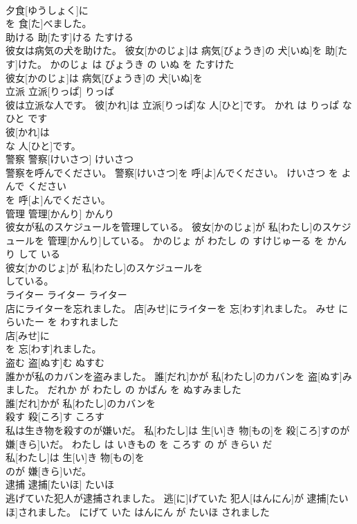 \documentclass[8pt]{extreport}
\begin{document}
\begin{CJK}{UTF8}{min}
\\	夕食[ゆうしょく]に
\\	を 食[た]べました。		
\\	助ける	助[たす]ける	たすける	
\\	彼女は病気の犬を助けた。	彼女[かのじょ]は 病気[びょうき]の 犬[いぬ]を 助[たす]けた。	かのじょ は びょうき の いぬ を たすけた	
\\	彼女[かのじょ]は 病気[びょうき]の 犬[いぬ]を
\\	立派	立派[りっぱ]	りっぱ	
\\	彼は立派な人です。	彼[かれ]は 立派[りっぱ]な 人[ひと]です。	かれ は りっぱ な ひと です	
\\	彼[かれ]は
\\	な 人[ひと]です。		
\\	警察	警察[けいさつ]	けいさつ	
\\	警察を呼んでください。	警察[けいさつ]を 呼[よ]んでください。	けいさつ を よんで ください	
\\	を 呼[よ]んでください。		
\\	管理	管理[かんり]	かんり	
\\	彼女が私のスケジュールを管理している。	彼女[かのじょ]が 私[わたし]のスケジュールを 管理[かんり]している。	かのじょ が わたし の すけじゅーる を かんり して いる	
\\	彼女[かのじょ]が 私[わたし]のスケジュールを
\\	している。		
\\	ライター	ライター	ライター	
\\	店にライターを忘れました。	店[みせ]にライターを 忘[わす]れました。	みせ に らいたー を わすれました	
\\	店[みせ]に
\\	を 忘[わす]れました。		
\\	盗む	盗[ぬす]む	ぬすむ	
\\	誰かが私のカバンを盗みました。	誰[だれ]かが 私[わたし]のカバンを 盗[ぬす]みました。	だれか が わたし の かばん を ぬすみました	
\\	誰[だれ]かが 私[わたし]のカバンを
\\	殺す	殺[ころ]す	ころす	
\\	私は生き物を殺すのが嫌いだ。	私[わたし]は 生[い]き 物[もの]を 殺[ころ]すのが 嫌[きら]いだ。	わたし は いきもの を ころす の が きらい だ	
\\	私[わたし]は 生[い]き 物[もの]を
\\	のが 嫌[きら]いだ。		
\\	逮捕	逮捕[たいほ]	たいほ	
\\	逃げていた犯人が逮捕されました。	逃[に]げていた 犯人[はんにん]が 逮捕[たいほ]されました。	にげて いた はんにん が たいほ されました	

\end{CJK}
\end{document}
